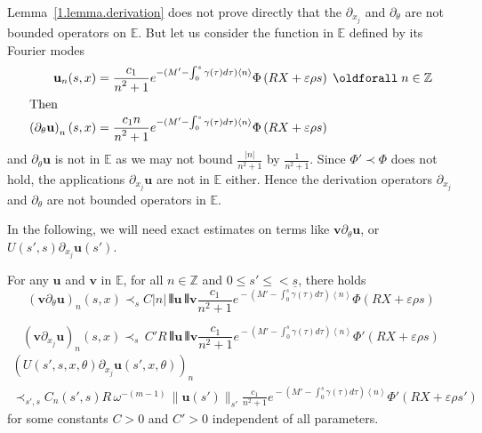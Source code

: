 \documentclass[AHL,Unicode,longabstracts,published]{cedram}
\theoremstyle{plain}
\newcommand*\e{\varepsilon}
\newcommand*\Z{{\mathbb Z}}
\newcommand{\dptl}{\partial}%
\newcommand*\EE{{\mathbb E}}
\newcommand*\g{\gamma}
\newcommand{\ubf}{{\mathbf u}}
\newcommand{\vbf}{{\mathbf v}}
\newcommand*\dsp{\displaystyle}
\newcommand*\und{\underline}
\DeclarePairedDelimiter{\VERT}{|\mkern -1.6mu|\mkern -1.6mu|}{|\mkern -1.6mu|\mkern -1.6mu|}
\renewcommand*{\forall}{\mathrel{\oldforall}}
\begin{document}
\begin{rema}
Lemma~\ref{1.lemma.derivation} does not prove directly that the $\dptl_{x_j}$ and $\dptl_{\theta}$ are not bounded operators on $\EE$. But let us consider the function in $\EE$ defined by its Fourier modes
\begin{align*}
\ubf_n(s,x) &= \frac{\dsp c_1}{\dsp n^2+1} e^{{}-(M'- \int_{0}^{s}\g(\tau) d\tau) \left<n\right>} \Phi\left(R X+\e\rho s\right) \, \forall n\in\Z\\
\intertext{Then}
\left(\dptl_{\theta}\ubf\right)_n(s,x) &= \frac{\dsp c_1 n}{\dsp n^2+1} e^{{}-(M'- \int_{0}^{s}\g(\tau) d\tau) \left<n\right>} \Phi\left(R X+\e\rho s\right)
\end{align*}
and $\dptl_{\theta}\ubf$ is not in $\EE$ as we may not bound $ \frac{|n|}{n^2+1}$ by $ \frac{1}{n^2+1} $. Since $\Phi' \prec \Phi$ does not hold, the applications $\dptl_{x_j} \ubf$ are not in $\EE$ either. Hence the derivation operators $\dptl_{x_j}$ and $\dptl_{\theta}$ are not bounded operators in $\EE$.
\end{rema}

In the following, we will need exact estimates on terms like $\vbf\dptl_{\theta}\ubf$, or $U(s',s)\dptl_{x_j}\ubf(s')$.

\begin{lemm}\label{1.lemma.product.lack}

For any $\ubf$ and $\vbf$ in $\EE$, for all $n\in\Z$ and $0\leq s' \leq <\und{s}$, there holds
\begin{equation}\label{1.action.product.dtheta}
(\vbf\dptl_{\theta}\ubf)_n(s,x) \prec_{s} C|n| \,\VERT{\ubf}\, \VERT{\vbf} \frac{\dsp c_1}{\dsp n^2+1} e^{{}-(M'- \int_{0}^{s}\g(\tau) d\tau) \left<n\right>} \Phi\left(R X+\e\rho s\right) 
\end{equation}

\begin{equation}\label{1.action.product.dy}
(\vbf\dptl_{x_j}\ubf)_n(s,x) \prec_{s} \,C'R\, \VERT{\ubf}\, \VERT{\vbf} \frac{\dsp c_1}{\dsp n^2+1} e^{{}-(M'- \int_{0}^{s}\g(\tau) d\tau) \left<n\right>} \Phi'\left(R X+\e\rho s\right) 
\end{equation}
\begin{multline}\label{1.action.U.dy}
(U(s',s,x,\theta)\dptl_{x_j}\ubf(s',x,\theta))_n \\
\prec_{s',s} C_n(s',s)R\, \omega^{-(m-1)}\,\|\ubf(s')\|_{s'} \frac{\dsp c_1}{\dsp n^2+1} e^{{}-(M'- \int_{0}^{s}\g(\tau) d\tau) \left<n\right>} \Phi'\left(R X+\e\rho s'\right) 
\end{multline}
for some constants $C>0$ and $C'>0$ independent of all parameters.
\end{lemm}
\end{document}
